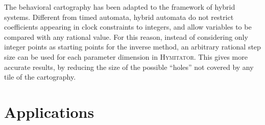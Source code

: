 \documentclass{llncs}
\newcommand{\hymitator}{\textsc{Hymitator}}
\newcommand{\commentaire}[1]{\textcolor{red}{\textbf{$\Leftarrow$  #1 $\Rightarrow$}}}
\begin{document}

The behavioral cartography has been adapted to the framework of hybrid systems.
Different  from timed automata, hybrid automata do not restrict coefficients appearing in clock constraints to integers, and allow variables to be compared with any rational value.
For this reason, instead of considering only integer points as starting points for the inverse method, an arbitrary rational step size can be used for each parameter dimension in \hymitator{}.
This gives more accurate results, by reducing the size of the possible ``holes'' not covered by any tile of the cartography.


\section{Applications}
\end{document}
